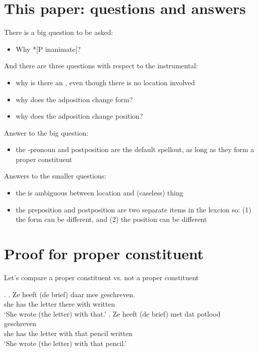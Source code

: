 \documentclass[12pt]{article}
\begin{document}
\section{This paper: questions and answers}

There is a big question to be asked:

\begin{itemize}
  \item Why *[P inanimate]?
\end{itemize}

And there are three questions with respect to the instrumental:

\begin{itemize}
  \item why is there an , even though there is no location involved
  \item why does the adposition change form?
  \item why does the adposition change position?
\end{itemize}


Answer to the big question:

\begin{itemize}
  \item the -pronoun and postposition are the default spellout, as long as they form a proper constituent
\end{itemize}

Answers to the smaller questions:

\begin{itemize}
  \item the  is ambiguous between location and (caseless) thing
  \item the preposition and postposition are two separate items in the lexcion so: (1) the form can be different, and (2) the position can be different
\end{itemize}


\section{Proof for proper constituent}

Let's compare a proper constituent vs. not a proper constituent

\ex.
\ag. Ze heeft (de brief) daar mee geschreven.\\
 she has the letter there with written\\
 `She wrote (the letter) with that.'
\bg. Ze heeft (de brief) met dat potlood geschreven\\
 she has the letter with that pencil written\\
 `She wrote (the letter) with that pencil.'
\end{document}
